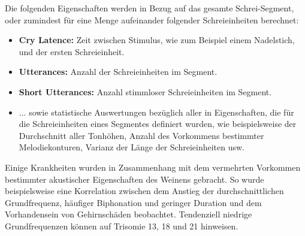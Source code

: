 Die folgenden Eigenschaften werden in Bezug auf das gesamte Schrei-Segment, oder zumindest für eine Menge aufeinander folgender Schreieinheiten berechnet:

\begin{itemize}
	\item \textbf{Cry Latence: } Zeit zwischen Stimulus, wie zum Beispiel einem Nadelstich, und der ersten Schreieinheit.
	\item \textbf{Utterances: } Anzahl der Schreieinheiten im Segment.
	\item \textbf{Short Utterances: } Anzahl stimmloser Schreieinheiten im Segment.
	\item ... sowie statistische Auswertungen bezüglich aller in Eigenschaften, die für die Schreieinheiten eines Segmentes definiert wurden, wie beispielsweise der Durchschnitt aller Tonhöhen, Anzahl des Vorkommens bestimmter Melodiekonturen, Varianz der Länge der Schreieinheiten usw.\cite[S. 85]{parentalPerception}
\end{itemize}

Einige Krankheiten wurden in Zusammenhang mit dem vermehrten Vorkommen bestimmter akustischer Eigenschaften des Weinens gebracht. So wurde beispielsweise eine Korrelation zwischen dem Anstieg der durchschnittlichen Grundfrequenz, häufiger Biphonation und geringer Duration und dem Vorhandensein von Gehirnschäden beobachtet. Tendenziell niedrige Grundfrequenzen können auf Trisomie 13, 18 und 21 hinweisen.\cite[S. 85]{parentalPerception}

